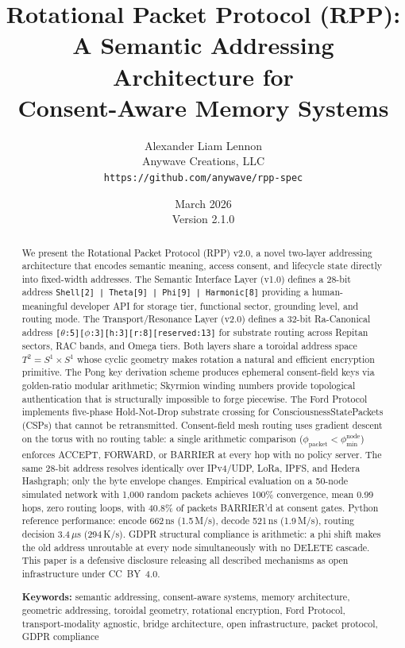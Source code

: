 \documentclass[11pt,a4paper]{article}
\title{Rotational Packet Protocol (RPP):\\
A Semantic Addressing Architecture for\\
Consent-Aware Memory Systems}
\author{
    Alexander Liam Lennon\\
    Anywave Creations, LLC\\
    \texttt{https://github.com/anywave/rpp-spec}
}
\date{March 2026\\Version 2.1.0}
\begin{document}
\maketitle

\begin{abstract}
We present the Rotational Packet Protocol (RPP) v2.0, a novel two-layer addressing architecture that encodes semantic meaning, access consent, and lifecycle state directly into fixed-width addresses. The Semantic Interface Layer (v1.0) defines a 28-bit address \texttt{Shell[2] | Theta[9] | Phi[9] | Harmonic[8]} providing a human-meaningful developer API for storage tier, functional sector, grounding level, and routing mode. The Transport/Resonance Layer (v2.0) defines a 32-bit Ra-Canonical address \texttt{[}\ensuremath{\theta}\texttt{:5][}\ensuremath{\phi}\texttt{:3][h:3][r:8][reserved:13]} for substrate routing across Repitan sectors, RAC bands, and Omega tiers. Both layers share a toroidal address space $T^2 = S^1 \times S^1$ whose cyclic geometry makes rotation a natural and efficient encryption primitive. The Pong key derivation scheme produces ephemeral consent-field keys via golden-ratio modular arithmetic; Skyrmion winding numbers provide topological authentication that is structurally impossible to forge piecewise. The Ford Protocol implements five-phase Hold-Not-Drop substrate crossing for ConsciousnessStatePackets (CSPs) that cannot be retransmitted. Consent-field mesh routing uses gradient descent on the torus with no routing table: a single arithmetic comparison ($\phi_{\text{packet}} < \phi_{\min}^{\text{node}}$) enforces ACCEPT, FORWARD, or BARRIER at every hop with no policy server. The same 28-bit address resolves identically over IPv4/UDP, LoRa, IPFS, and Hedera Hashgraph; only the byte envelope changes. Empirical evaluation on a 50-node simulated network with 1,000 random packets achieves 100\% convergence, mean 0.99 hops, zero routing loops, with 40.8\% of packets BARRIER'd at consent gates. Python reference performance: encode 662\,ns (1.5\,M/s), decode 521\,ns (1.9\,M/s), routing decision 3.4\,$\mu$s (294\,K/s). GDPR structural compliance is arithmetic: a phi shift makes the old address unroutable at every node simultaneously with no DELETE cascade. This paper is a defensive disclosure releasing all described mechanisms as open infrastructure under CC~BY~4.0.

\medskip
\noindent\textbf{Keywords:} semantic addressing, consent-aware systems, memory architecture, geometric addressing, toroidal geometry, rotational encryption, Ford Protocol, transport-modality agnostic, bridge architecture, open infrastructure, packet protocol, GDPR compliance
\end{abstract}
\end{document}
